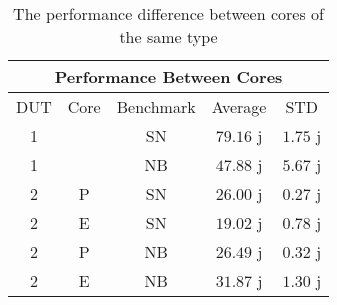 \begin{table}[H]
    \centering
\begin{tabular}{|| c | c | c | c | c ||}
    \hline
    \multicolumn{5}{||c||}{Performance Between Cores} \\ [0.5ex] \hline\hline
    DUT & Core & Benchmark & Average & STD \\\hline
    1 & & SN & $79.16$ j & $1.75$ j\\
    1 & & NB & $47.88$ j & $5.67$ j\\
    2 & P & SN & $26.00$ j & $0.27$ j\\
    2 & E & SN & $19.02$ j & $0.78$ j\\
    2 & P & NB & $26.49$ j & $0.32$ j\\
    2 & E & NB & $31.87$ j & $1.30$ j\\\hline
    \end{tabular}
    \caption{The performance difference between cores of the same type}
    \label{tab:dut-2-exp-3-std-and-avg}
\end{table}









